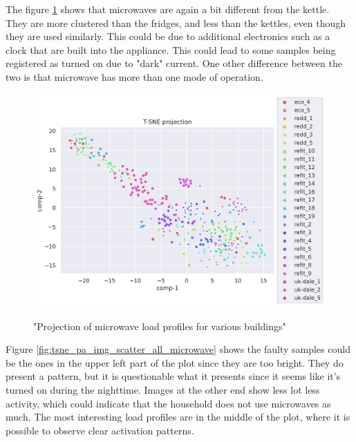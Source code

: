 The figure \ref{fig:tsne_pa_scatter_all_microwave} shows that microwaves are again a bit different from the kettle.
They are more clustered than the fridges, and less than the kettles, even though they are used similarly.
This could be due to additional electronics such as a clock that are built into
the appliance. This could lead to some samples being registered as turned on due to 
"dark" current. One other difference between the two is that microwave has more than one mode of operation.

\begin{figure}[H]
	\centering
	\caption{"Projection of microwave load profiles for various buildings"}
	\includegraphics[width=1.2\textwidth]{Figures/TSNE/TSNE_per_appliance/all/scatter_all_microwave.png}
	\label{fig:tsne_pa_scatter_all_microwave}
\end{figure}

Figure \ref{fig:tsne_pa_img_scatter_all_microwave} shows the faulty samples could be the ones in the upper left part of the plot since they are too bright.
They do present a pattern, but it is questionable what it presents since it seems like it's turned on during the nighttime. 
Images at the other end show less lot less activity, which could indicate that
the household does not use microwaves as much. The most interesting load profiles are in the middle of the 
plot, where it is possible to observe clear activation patterns. 

